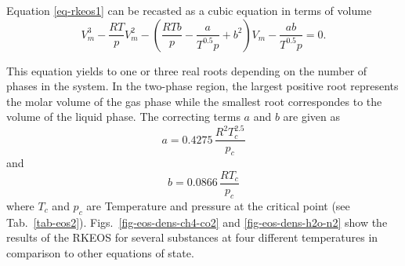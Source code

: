Equation \eqref{eq-rkeos1} can be recasted as a cubic equation in terms of volume
%
\begin{equation}
V_m^3-\frac{RT}{p}V_m^2-\left(\frac{RTb}{p}-\frac{a}{T^{0.5}p}+b^2\right)V_m-\frac{ab}{T^{0.5}p}=0.
\label{eq-rkeos2}
\end{equation}
              
This equation yields to one or three real roots depending on the number of phases in the system. In the two-phase region, the largest positive root represents the molar volume of the gas phase while the smallest root correspondes to the volume of the liquid phase. The correcting terms $a$ and $b$ are given as
%
\begin{equation}
a=0.4275\,\frac{R^2 T_c^{2.5}}{p_c}
\label{eq-rkeos_a}
\end{equation}
%
and
%
\begin{equation}
b= 0.0866\,\frac{RT_c}{p_c}
\label{eq-rkeos_b}
\end{equation}
%
where $T_c$ and $p_c$ are Temperature and pressure at the critical point (see Tab.~\ref{tab-eos2}). Figs.~\ref{fig-eos-dens-ch4-co2} and \ref{fig-eos-dens-h2o-n2} show the results of the RKEOS for several substances at four different temperatures in comparison to other equations of state.

